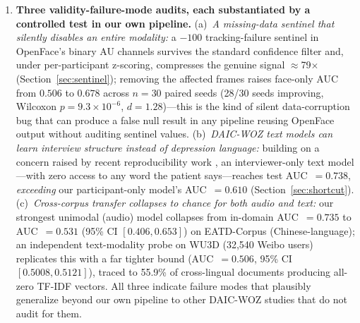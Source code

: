 \documentclass[journal]{IEEEtran}
\begin{document}
\begin{enumerate}
  \item \textbf{Three validity-failure-mode audits, each substantiated
  by a controlled test in our own pipeline.} (a)~\emph{A missing-data
  sentinel that silently disables an entire modality:} a $-100$
  tracking-failure sentinel in OpenFace's binary AU channels survives
  the standard confidence filter and, under per-participant z-scoring,
  compresses the genuine signal $\approx$79$\times$
  (Section~\ref{sec:sentinel}); removing the affected frames raises
  face-only AUC from $0.506$ to $0.678$ across $n{=}30$ paired seeds
  (28/30 seeds improving, Wilcoxon $p{=}9.3{\times}10^{-6}$,
  $d{=}1.28$)---this is
  the kind of silent data-corruption bug that can produce a false null
  result in any pipeline reusing OpenFace output without auditing
  sentinel values. (b)~\emph{DAIC-WOZ text models can learn interview
  structure instead of depression language:} building on a concern
  raised by recent reproducibility work
  \cite{burdisso2024therapist,patapati2025invalid}, an interviewer-only
  text model---with zero access to any word the patient
  says---reaches test AUC~$=0.738$, \emph{exceeding} our
  participant-only model's AUC~$=0.610$ (Section~\ref{sec:shortcut}).
  (c)~\emph{Cross-corpus transfer collapses to chance for both audio
  and text:} our strongest unimodal (audio) model collapses from
  in-domain AUC~$=0.735$ to AUC~$=0.531$ (95\% CI $[0.406,0.653]$) on
  EATD-Corpus (Chinese-language); an independent text-modality probe
  on WU3D \cite{wang2020wu3d} (32,540 Weibo users) replicates this with
  a far tighter bound (AUC~$=0.506$, 95\% CI $[0.5008,0.5121]$), traced
  to 55.9\% of cross-lingual documents producing all-zero TF-IDF
  vectors. All three indicate failure modes that plausibly generalize
  beyond our own pipeline to other DAIC-WOZ studies that do not audit
  for them.


\end{enumerate}
\end{document}
